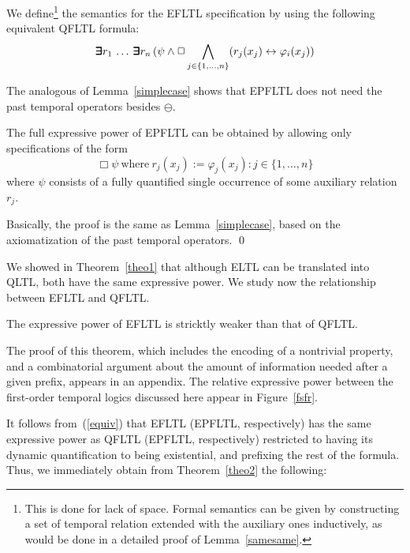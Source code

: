 We define\footnote{This is done for lack of space. Formal semantics 
can be given by constructing a set of temporal relation extended
with the auxiliary ones
inductively, as would be done in a detailed proof of Lemma~\ref{samesame}.} the semantics for the EFLTL specification by using the following equivalent
QFLTL formula:
\begin{equation} \label{equiv}
\bm{\exists}\kern-0.6em\bm{\exists} r_1  \, \ldots \, \bm{\exists}\kern-0.6em\bm{\exists} r_n \,  ( \psi \wedge \Box \bigwedge_{j \in \{ 1, \ldots , n\}} (r_j ( x_j )  \leftrightarrow 
\varphi_i ( x_j) )
\end{equation}



 
The analogous of Lemma~\ref{simplecase} shows that EPFLTL does not
need the past temporal operators besides $\ominus$.
\begin{lemma}
The full expressive power of EPFLTL can be obtained by allowing only 
specifications of the form
\[ \Box \psi \mathrm{\ where\ } r_j  ( x_j ) := 
\varphi_j (x_j) : j \in \{ 1 , \ldots , n \} \]
where $\psi$ consists of a fully quantified single occurrence of some
auxiliary relation $r_j$.
\end{lemma}
 Basically, the proof is the same as Lemma~\ref{simplecase}, based on the axiomatization of the
past temporal operators. \qed








We showed in Theorem~\ref{theo1} that although ELTL
can be translated into QLTL, both have the same
expressive power. We study now the relationship between
EFLTL and QFLTL.

\begin{theorem}
\label{theo2}
The expressive power of EFLTL is stricktly weaker than that of QFLTL.
\end{theorem}
The proof of this theorem, which includes the encoding of a nontrivial property, and a combinatorial argument about the amount of information
needed after a given prefix, appears in an appendix.
The relative expressive power between the first-order temporal logics discussed here
appear in Figure~\ref{fsfr}.

It follows from~(\ref{equiv}) that EFLTL (EPFLTL, respectively) has the same
expressive power as QFLTL (EPFLTL, respectively) restricted to having its
dynamic 
quantification to being existential, and prefixing the
rest of the formula. Thus, we immediately obtain from Theorem~\ref{theo2} the following:

